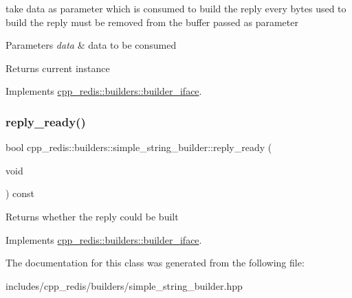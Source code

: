 take data as parameter which is consumed to build the reply every bytes used to build the reply must be removed from the buffer passed as parameter


\begin{DoxyParams}{Parameters}
{\em data} & data to be consumed \\
\hline
\end{DoxyParams}
\begin{DoxyReturn}{Returns}
current instance 
\end{DoxyReturn}


Implements \hyperlink{classcpp__redis_1_1builders_1_1builder__iface_a9892bbc9c887c31c2742dad4476e2fa6}{cpp\+\_\+redis\+::builders\+::builder\+\_\+iface}.

\mbox{\label{classcpp__redis_1_1builders_1_1simple__string__builder_ad586164caf02b3022b91789cac23a72d}} 
\subsubsection{\texorpdfstring{reply\+\_\+ready()}{reply\_ready()}}
{\footnotesize\ttfamily bool cpp\+\_\+redis\+::builders\+::simple\+\_\+string\+\_\+builder\+::reply\+\_\+ready (\begin{DoxyParamCaption}\item[{void}]{ }\end{DoxyParamCaption}) const\hspace{0.3cm}{\ttfamily [virtual]}}

\begin{DoxyReturn}{Returns}
whether the reply could be built 
\end{DoxyReturn}


Implements \hyperlink{classcpp__redis_1_1builders_1_1builder__iface_a40db9a31d4ea1771777e74146d31e12d}{cpp\+\_\+redis\+::builders\+::builder\+\_\+iface}.



The documentation for this class was generated from the following file\+:\begin{DoxyCompactItemize}
\item 
includes/cpp\+\_\+redis/builders/simple\+\_\+string\+\_\+builder.\+hpp\end{DoxyCompactItemize}
